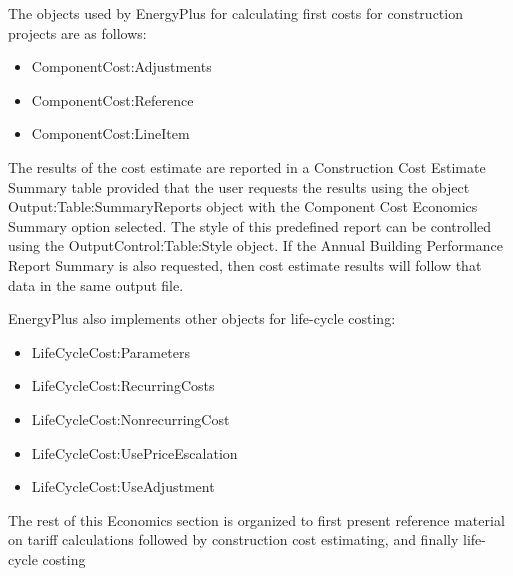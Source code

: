 The objects used by EnergyPlus for calculating first costs for construction projects are as follows:

\begin{itemize}
\item
  ComponentCost:Adjustments
\item
  ComponentCost:Reference
\item
  ComponentCost:LineItem
\end{itemize}

The results of the cost estimate are reported in a Construction Cost Estimate Summary table provided that the user requests the results using the object Output:Table:SummaryReports object with the Component Cost Economics Summary option selected. The style of this predefined report can be controlled using the OutputControl:Table:Style object. If the Annual Building Performance Report Summary is also requested, then cost estimate results will follow that data in the same output file.

EnergyPlus also implements other objects for life-cycle costing:

\begin{itemize}
\item
  LifeCycleCost:Parameters
\item
  LifeCycleCost:RecurringCosts
\item
  LifeCycleCost:NonrecurringCost
\item
  LifeCycleCost:UsePriceEscalation
\item
  LifeCycleCost:UseAdjustment
\end{itemize}


The rest of this Economics section is organized to first present reference material on tariff calculations followed by construction cost estimating, and finally
life-cycle costing
